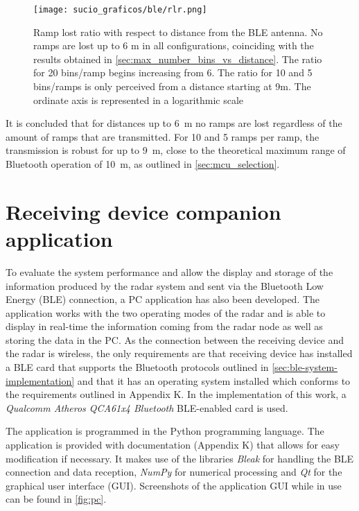 \begin{figure}[ht]
	\centering
	\texttt{[image: sucio\_graficos/ble/rlr.png]}
	\caption{Ramp lost ratio with respect to distance from the BLE antenna. No ramps are lost up to 6 m in all configurations, coinciding with the results obtained in \cref{sec:max_number_bins_vs_distance}. The ratio for 20 bins/ramp begins increasing from 6. The ratio for 10 and 5 bins/ramps is only perceived from a distance starting at 9m. The ordinate axis is represented in a logarithmic scale}
	\label{fig:firmware_ble_char_rlr}
\end{figure}

It is concluded that for distances up to \SI{6}{\metre} no ramps are lost regardless of the amount of ramps that are transmitted. For 10 and 5 ramps per ramp, the transmission is robust for up to \SI{9}{\metre}, close to the theoretical maximum range of Bluetooth operation of \SI{10}{\metre}, as outlined in \cref{sec:mcu_selection}.

\section{Receiving device companion application}

To evaluate the system performance and allow the display and storage of the information produced by the radar system and sent via the Bluetooth Low Energy (BLE) connection, a PC application has also been developed. The application works with the two operating modes of the radar and is able to display in real-time the information coming from the radar node as well as storing the data in the PC. As the connection between the receiving device and the radar is wireless, the only requirements are that receiving device has installed a BLE card that supports the Bluetooth protocols outlined in \cref{sec:ble-system-implementation} and that it has an operating system installed which conforms to the requirements outlined in Appendix K. In the implementation of this work, a \textit{Qualcomm Atheros QCA61x4 Bluetooth} BLE-enabled card is used.

The application is programmed in the Python programming language. The application is provided with documentation (Appendix K) that allows for easy modification if necessary. It makes use of the libraries \textit{Bleak} \cite{BleakDoc} for handling the BLE connection and data reception, \textit{NumPy} \cite{NumPyDoc} for numerical processing and \textit{Qt} \cite{QtDoc} for the graphical user interface (GUI). Screenshots of the application GUI while in use can be found in \cref{fig:pc}. %

